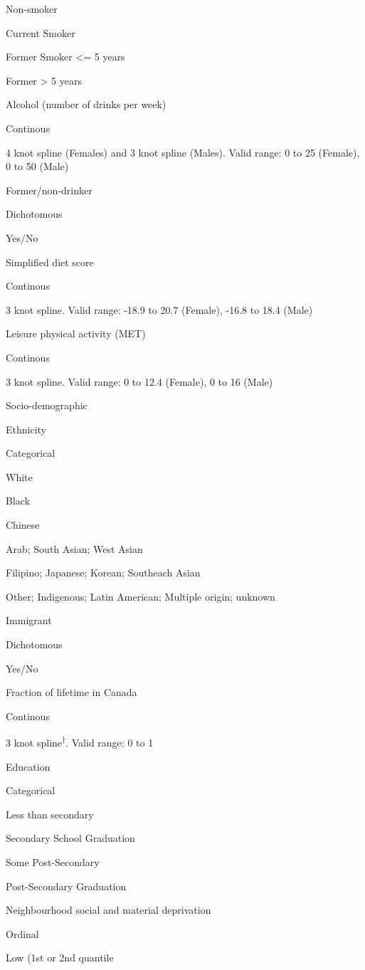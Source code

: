 \documentclass[]{book}
\begin{document}
Non-smoker

Current Smoker

Former Smoker \textless{}= 5 years

Former \textgreater{} 5 years

Alcohol (number of drinks per week)

Continous

4 knot spline (Females) and 3 knot spline (Males). Valid range: 0 to 25
(Female), 0 to 50 (Male)

Former/non-drinker

Dichotomous

Yes/No

Simplified diet score

Continous

3 knot spline. Valid range: -18.9 to 20.7 (Female), -16.8 to 18.4 (Male)

Leisure physical activity (MET)

Continous

3 knot spline. Valid range: 0 to 12.4 (Female), 0 to 16 (Male)

Socio-demographic

Ethnicity

Categorical

White

Black

Chinese

Arab; South Asian; West Asian

Filipino; Japanese; Korean; Southeach Asian

Other; Indigenous; Latin American; Multiple origin; unknown

Immigrant

Dichotomous

Yes/No

Fraction of lifetime in Canada

Continous

3 knot spline\textsuperscript{†}. Valid range: 0 to 1

Education

Categorical

Less than secondary

Secondary School Graduation

Some Post-Secondary

Post-Secondary Graduation

Neighbourhood social and material deprivation

Ordinal

Low (1st or 2nd quantile
\end{document}
